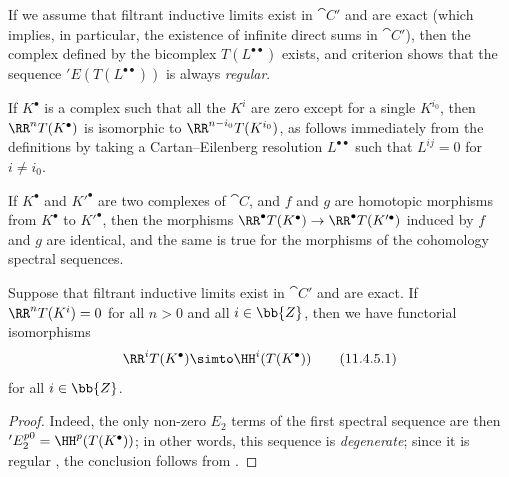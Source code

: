 \begin{env}[11.4.3]
If we assume that filtrant inductive limits exist in $\cat{C}'$ and are exact (which implies, in particular, the existence of infinite direct sums in $\cat{C}'$), then the complex defined by the bicomplex $T(L^{\bullet\bullet})$ exists, and criterion  shows that the sequence $'E(T(L^{\bullet\bullet}))$ is always \emph{regular}.

If $K^\bullet$ is a complex such that all the $K^i$ are zero except for a single $K^{i_0}$, then
$\RR^n T(K^\bullet)$ is isomorphic to $\RR^{n-i_0} T(K^{i_0})$, as follows immediately from the definitions by taking a Cartan--Eilenberg resolution $L^{\bullet\bullet}$ such that $L^{ij}=0$ for $i\neq i_0$.

If $K^\bullet$ and $K'^\bullet$ are two complexes of $\cat{C}$, and $f$ and $g$ are homotopic morphisms from $K^\bullet$ to $K'^\bullet$, then the morphisms $\RR^\bullet T(K^\bullet) \rightarrow \RR^\bullet T(K'^\bullet)$ induced by $f$ and $g$ are identical, and the same is true for the morphisms of the cohomology spectral sequences.
\end{env}

\begin{proposition}[11.4.5]
\label{0.11.4.5}
Suppose that filtrant inductive limits exist in $\cat{C}'$ and are exact.
If $\RR^n T(K^i) = 0$ for all $n>0$ and all $i\in\bb{Z}$, then we have functorial isomorphisms
\[
\label{0.11.4.5.1}
  \RR^i T(K^\bullet) \simto \HH^i(T(K^\bullet))
\tag{11.4.5.1}
\]
for all $i\in\bb{Z}$.
\end{proposition}

\begin{proof}
Indeed, the only non-zero $E_2$ terms of the first spectral sequence  are then $'E_2^{p0} = \HH^p(T(K^\bullet))$;
in other words, this sequence is \emph{degenerate};
since it is regular , the conclusion follows from .
\end{proof}

